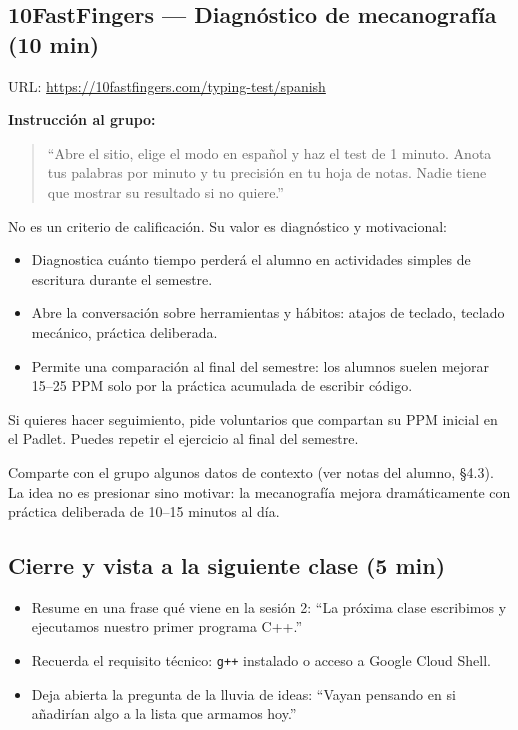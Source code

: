 \documentclass[12pt, oneside]{article}
\begin{document}
\subsection{10FastFingers — Diagnóstico de mecanografía (10 min)}

URL: \url{https://10fastfingers.com/typing-test/spanish}

\textbf{Instrucción al grupo:}
\begin{quote}
  ``Abre el sitio, elige el modo en español y haz el test de 1 minuto.
  Anota tus palabras por minuto y tu precisión en tu hoja de notas.
  Nadie tiene que mostrar su resultado si no quiere.''
\end{quote}

\begin{notaprofesor}
  No es un criterio de calificación. Su valor es diagnóstico y motivacional:

  \begin{itemize}
    \item Diagnostica cuánto tiempo perderá el alumno en actividades simples
          de escritura durante el semestre.
    \item Abre la conversación sobre herramientas y hábitos: atajos de teclado,
          teclado mecánico, práctica deliberada.
    \item Permite una comparación al final del semestre: los alumnos suelen
          mejorar 15--25 PPM solo por la práctica acumulada de escribir código.
  \end{itemize}

  Si quieres hacer seguimiento, pide voluntarios que compartan su PPM inicial
  en el Padlet. Puedes repetir el ejercicio al final del semestre.
\end{notaprofesor}

Comparte con el grupo algunos datos de contexto (ver notas del alumno,
\S4.3). La idea no es presionar sino motivar: la mecanografía mejora
dramáticamente con práctica deliberada de 10--15 minutos al día.

\subsection{Cierre y vista a la siguiente clase (5 min)}

\begin{itemize}
  \item Resume en una frase qué viene en la sesión 2: ``La próxima clase
        escribimos y ejecutamos nuestro primer programa C++.''
  \item Recuerda el requisito técnico: \texttt{g++} instalado o acceso a
        Google Cloud Shell.
  \item Deja abierta la pregunta de la lluvia de ideas: ``Vayan pensando en
        si añadirían algo a la lista que armamos hoy.''
\end{itemize}
\end{document}
